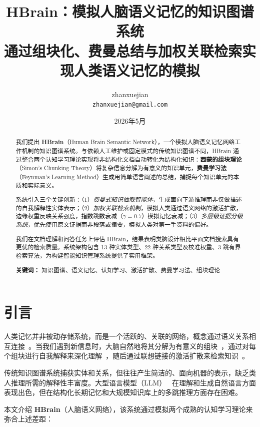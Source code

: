 \documentclass[11pt]{article}
\title{HBrain：模拟人脑语义记忆的知识图谱系统\\
通过组块化、费曼总结与加权关联检索实现人类语义记忆的模拟}
\author{
  zhanxuejian\\
  \texttt{zhanxuejian@gmail.com}
}
\date{2026年5月}
\begin{document}
\maketitle

\begin{abstract}
我们提出 \textbf{HBrain}（Human Brain Semantic Network），一个模拟人脑语义记忆网络工作机制的知识图谱系统。与依赖人工维护或固定模式的传统知识图谱不同，HBrain 通过整合两个认知学习理论实现将非结构化文档自动转化为结构化知识：\textbf{西蒙的组块理论}（Simon's Chunking Theory）将复杂信息分解为有意义的知识单元，\textbf{费曼学习法}（Feynman's Learning Method）生成用简单语言阐述的总结，捕捉每个知识单元的本质和实际意义。

系统引入三个关键创新：（1）\textit{费曼式知识抽取智能体}，生成面向下游推理而非仅做描述的自我解释性实体表示；（2）\textit{加权关联检索机制}，模拟人类通过语义网络的激活扩散，边缘权重反映关系强度，指数跳数衰减（$\gamma = 0.7$）模拟记忆衰减；（3）\textit{多层级证据分级系统}，优先使用原文证据而非段落或摘要，模拟人类对第一手资料的偏好。

我们在文档理解和问答任务上评估 HBrain，结果表明类脑设计相比平面文档搜索具有更优的检索质量。系统架构包含 13 种实体类型、22 种关系类型及校准权重、3 跳有界检索算法，为构建智能知识管理系统提供了实用框架。

\medskip
\noindent\textbf{关键词：} 知识图谱、语义记忆、认知学习、激活扩散、费曼学习法、组块理论
\end{abstract}

\section{引言}
\label{sec:introduction}

人类记忆并非被动存储系统，而是一个活跃的、关联的网络，概念通过语义关系相互连接~\cite{collins1969semantic}。当我们遇到新信息时，大脑自然地将其分解为有意义的组块~\cite{miller1956magical}，通过对每个组块进行自我解释来深化理解~\cite{chi1989self}，随后通过联想链接的激活扩散来检索知识~\cite{anderson1983architecture}。

传统知识图谱系统捕获实体和关系，但往往产生简洁的、面向机器的表示，缺乏类人推理所需的解释性丰富度。大型语言模型（LLM）~\cite{brown2020language} 在理解和生成自然语言方面表现出色，但在结构化长期记忆和大规模知识库上的多跳推理方面存在困难。

本文介绍 \textbf{HBrain}（人脑语义网络），该系统通过模拟两个成熟的认知学习理论来弥合上述差距：
\end{document}
